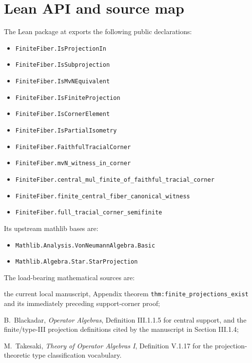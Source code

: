 \documentclass[11pt,reqno]{amsart}
\numberwithin{equation}{section}
\theoremstyle{definition}
\theoremstyle{remark}
\begin{document}
\section{Lean API and source map}
\label{sec:api_source_map}

The Lean package at
 exports the following public declarations:
\begin{itemize}[label={},leftmargin=0pt,itemsep=0pt,topsep=.25em]
  \item \texttt{FiniteFiber.}\allowbreak\texttt{IsProjectionIn}
  \item \texttt{FiniteFiber.}\allowbreak\texttt{IsSubprojection}
  \item \texttt{FiniteFiber.}\allowbreak\texttt{IsMvNEquivalent}
  \item \texttt{FiniteFiber.}\allowbreak\texttt{IsFiniteProjection}
  \item \texttt{FiniteFiber.}\allowbreak\texttt{IsCornerElement}
  \item \texttt{FiniteFiber.}\allowbreak\texttt{IsPartialIsometry}
  \item \texttt{FiniteFiber.}\allowbreak\texttt{FaithfulTracialCorner}
  \item \texttt{FiniteFiber.}\allowbreak\texttt{mvN\_witness\_in\_corner}
  \item \texttt{FiniteFiber.}\allowbreak\texttt{central\_mul\_finite\_of\_faithful\_tracial\_corner}
  \item \texttt{FiniteFiber.}\allowbreak\texttt{finite\_central\_fiber\_canonical\_witness}
  \item \texttt{FiniteFiber.}\allowbreak\texttt{full\_tracial\_corner\_semifinite}
\end{itemize}
Its upstream mathlib bases are:
\begin{itemize}[label={},leftmargin=0pt,itemsep=0pt,topsep=.25em]
  \item \texttt{Mathlib.Analysis.}\allowbreak\texttt{VonNeumannAlgebra.Basic}
  \item \texttt{Mathlib.Algebra.Star.}\allowbreak\texttt{StarProjection}
\end{itemize}

The load-bearing mathematical sources are:
\begin{enumerate}[label=\textup{[\arabic*]},leftmargin=2.5em]
  \item the current local manuscript, Appendix theorem
  \texttt{thm:finite\_projections\_exist} and its immediately preceding
  support-corner proof;
  \item B.~Blackadar, \emph{Operator Algebras}, Definition III.1.1.5 for
  central support, and the finite/type-III projection definitions cited by
  the manuscript in Section III.1.4;
  \item M.~Takesaki, \emph{Theory of Operator Algebras I}, Definition V.1.17
  for the projection-theoretic type classification vocabulary.
\end{enumerate}
\end{document}
